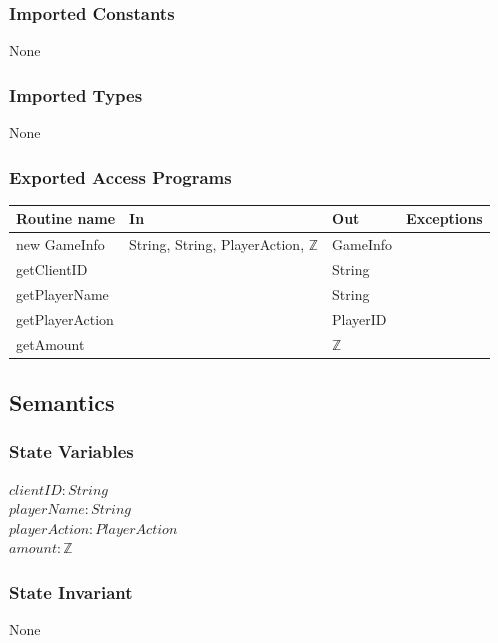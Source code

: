 \documentclass[12pt, titlepage]{article}
\begin{document}
        \subsubsection* {Imported Constants}
            None
        \subsubsection* {Imported Types}
            None
        \subsubsection* {Exported Access Programs}
        
        \begin{tabular}{| l | l | l | p{6cm} |}
            \hline
            \textbf{Routine name} & \textbf{In} & \textbf{Out} & \textbf{Exceptions}\\
            \hline
            new GameInfo & String, String, PlayerAction, $\mathbb{Z}$ & GameInfo & \\
            \hline
            getClientID &  & String & \\
            \hline
            getPlayerName &  & String &\\
            \hline 
            getPlayerAction &  & PlayerID & \\
            \hline 
            getAmount &  & $\mathbb{Z}$ &\\
            \hline 
        \end{tabular}
        
    \subsection* {Semantics}
    
    \subsubsection* {State Variables}
        $\mathit{clientID}: String$\\
        $\mathit{playerName}: String$\\
        $\mathit{playerAction}: PlayerAction$\\
        $\mathit{amount}: \mathbb{Z}$\\

    \subsubsection* {State Invariant}
        None
    
\end{document}
